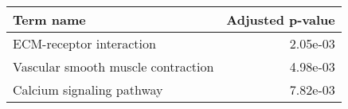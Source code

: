 \begin{tabular}{lr}
\toprule
                         Term name &  Adjusted p-value \\
\midrule
          ECM-receptor interaction &          2.05e-03 \\
Vascular smooth muscle contraction &          4.98e-03 \\
         Calcium signaling pathway &          7.82e-03 \\
\bottomrule
\end{tabular}
